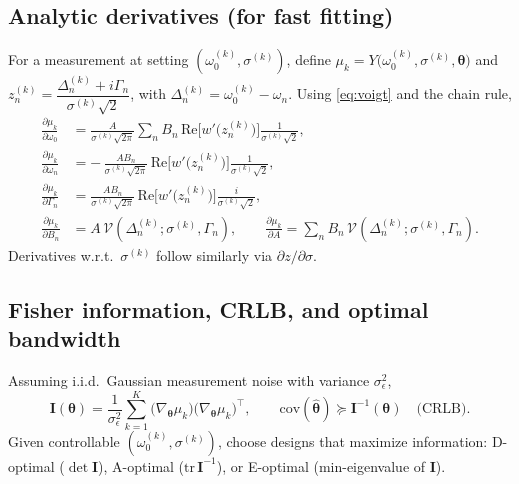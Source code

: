 \documentclass[aip,jap,preprint,amsmath,amssymb]{revtex4-2} %
\begin{document}
    \subsection{Analytic derivatives (for fast fitting)}
        For a measurement at setting $(\omega_0^{(k)},\sigma^{(k)})$, define
        $\mu_k=Y\big(\omega_0^{(k)},\sigma^{(k)},\boldsymbol{\theta}\big)$ and
        $z_n^{(k)}=\dfrac{\Delta_n^{(k)}+i\Gamma_n}{\sigma^{(k)}\sqrt{2}}$, with $\Delta_n^{(k)}=\omega_0^{(k)}-\omega_n$.
        Using \eqref{eq:voigt} and the chain rule,
        \begin{align}
            \frac{\partial \mu_k}{\partial \omega_0}
            &= \frac{A}{\sigma^{(k)}\sqrt{2\pi}}\sum_{n} B_n\,
            \mathrm{Re}\!\Big[w'\!\big(z_n^{(k)}\big)\Big]\frac{1}{\sigma^{(k)}\sqrt{2}},\\[3pt]
            \frac{\partial \mu_k}{\partial \omega_n}
            &= -\,\frac{A B_n}{\sigma^{(k)}\sqrt{2\pi}}\,
            \mathrm{Re}\!\Big[w'\!\big(z_n^{(k)}\big)\Big]\frac{1}{\sigma^{(k)}\sqrt{2}},\\[3pt]
            \frac{\partial \mu_k}{\partial \Gamma_n}
            &= \frac{A B_n}{\sigma^{(k)}\sqrt{2\pi}}\,
            \mathrm{Re}\!\Big[w'\!\big(z_n^{(k)}\big)\Big]\frac{i}{\sigma^{(k)}\sqrt{2}},\\[3pt]
            \frac{\partial \mu_k}{\partial B_n}
            &= A\,\mathcal{V}\!\left(\Delta_n^{(k)};\sigma^{(k)},\Gamma_n\right),\qquad
            \frac{\partial \mu_k}{\partial A}=\sum_n B_n\,\mathcal{V}\!\left(\Delta_n^{(k)};\sigma^{(k)},\Gamma_n\right).
        \end{align}
        Derivatives w.r.t.\ $\sigma^{(k)}$ follow similarly via $\partial z/\partial \sigma$.

    \subsection{Fisher information, CRLB, and optimal bandwidth}
        Assuming i.i.d.\ Gaussian measurement noise with variance $\sigma_\epsilon^2$,
        \begin{equation}
            \mathbf I(\boldsymbol{\theta})
            =\frac{1}{\sigma_\epsilon^2}\sum_{k=1}^{K}
            \big(\nabla_{\!\boldsymbol{\theta}}\mu_k\big)\big(\nabla_{\!\boldsymbol{\theta}}\mu_k\big)^{\!\top},
            \qquad
            \mathrm{cov}(\hat{\boldsymbol{\theta}})\succeq \mathbf I^{-1}(\boldsymbol{\theta})\quad\text{(CRLB)}.
        \end{equation}
        Given controllable $(\omega_0^{(k)},\sigma^{(k)})$, choose designs that maximize information:
        D-optimal ($\det\mathbf I$), A-optimal ($\mathrm{tr}\,\mathbf I^{-1}$), or E-optimal (min-eigenvalue of $\mathbf I$).
\end{document}
